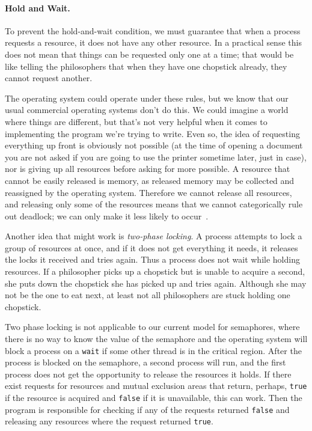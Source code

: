 \paragraph{Hold and Wait.} To prevent the hold-and-wait condition, we must guarantee that when a process requests a resource, it does not have any other resource. In a practical sense this does not mean that things can be requested only one at a time; that would be like telling the philosophers that when they have one chopstick already, they cannot request another.

The operating system could operate under these rules, but we know that our usual commercial operating systems don't do this. We could imagine a world where things are different, but that's not very helpful when it comes to implementing the program we're trying to write. Even so, the idea of requesting everything up front is obviously not possible (at the time of opening a document you are not asked if you are going to use the printer sometime later, just in case), nor is giving up all resources before asking for more possible. A resource that cannot be easily released is memory, as released memory may be collected and reassigned by the operating system. Therefore we cannot release all resources, and releasing only some of the resources means that we cannot categorically rule out deadlock; we can only make it less likely to occur~\cite{mte241}.

Another idea that might work is \textit{two-phase locking}. A process attempts to lock a group of resources at once, and if it does not get everything it needs, it releases the locks it received and tries again. Thus a process does not wait while holding resources. If a philosopher picks up a chopstick but is unable to acquire a second, she puts down the chopstick she has picked up and tries again. Although she may not be the one to eat next, at least not all philosophers are stuck holding one chopstick.

Two phase locking is not applicable to our current model for semaphores, where there is no way to know the value of the semaphore and the operating system will block a process on a \texttt{wait} if some other thread is in the critical region. After the process is blocked on the semaphore, a second process will run, and the first process does not get the opportunity to release the resources it holds. If there exist requests for resources and mutual exclusion areas that return, perhaps, \texttt{true} if the resource is acquired and \texttt{false} if it is unavailable, this can work. Then the program is responsible for checking if any of the requests returned \texttt{false} and releasing any resources where the request returned \texttt{true}.

